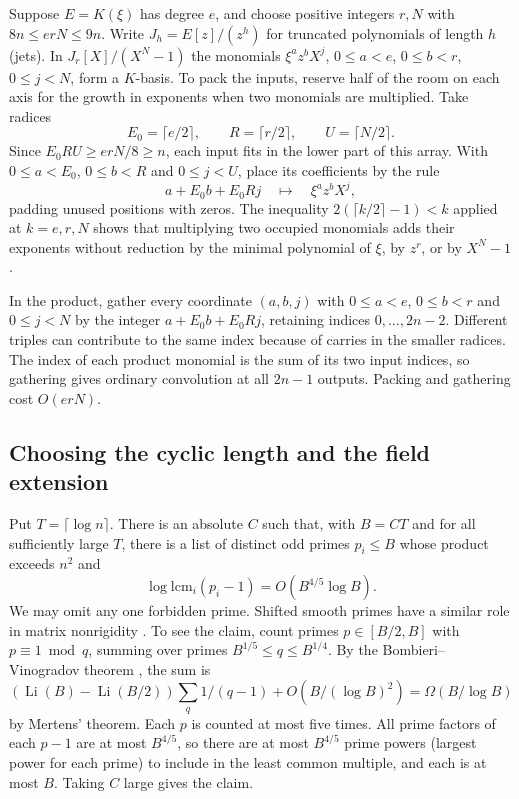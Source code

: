 Suppose $E=K(\xi)$ has degree $e$, and choose positive integers $r,N$
with $8n\le erN\le9n$. Write $J_h=E[z]/(z^h)$ for truncated
polynomials of length $h$ (jets). In $J_r[X]/(X^N-1)$ the monomials
$\xi^a z^b X^j$, $0\le a<e$, $0\le b<r$, $0\le j<N$, form a
$K$-basis. To pack the inputs, reserve half of the room on each axis
for the growth in exponents when two monomials are multiplied.
Take radices
\[
 E_0=\lceil e/2\rceil,\qquad R=\lceil r/2\rceil,\qquad
 U=\lceil N/2\rceil.
\]
Since $E_0 RU\ge erN/8\ge n$, each input fits in the lower part of this
array. With $0\le a<E_0$, $0\le b<R$ and $0\le j<U$, place its coefficients
by the rule
\begin{equation}\label{poly:eq:mixed-radix-packing}
           a+E_0 b+E_0 Rj \quad\longmapsto\quad \xi^a z^b X^j,
\end{equation}
padding unused positions with zeros. The inequality
$2(\lceil k/2\rceil-1)<k$ applied at $k=e,r,N$ shows that
multiplying two occupied monomials adds their exponents without
reduction by the minimal polynomial of $\xi$, by $z^r$, or by $X^N-1$.

In the product, gather every coordinate $(a,b,j)$ with
$0\le a<e$, $0\le b<r$ and $0\le j<N$ by the integer $a+E_0 b+E_0 Rj$, retaining
indices $0,\ldots,2n-2$. Different triples can contribute to the same
index because of carries in the smaller radices. The index of each
product monomial is the sum of its two input indices, so gathering
gives ordinary convolution at all $2n-1$ outputs. Packing and
gathering cost $O(erN)$.

\subsection{Choosing the cyclic length and the field extension}

Put $T=\lceil\log n\rceil$. There is an absolute $C$ such that, with
$B=CT$ and for all sufficiently large $T$, there is a list of distinct odd primes
$p_i\le B$ whose product exceeds $n^2$ and
\[
 \log\mathrm{lcm}_i(p_i-1)=O(B^{4/5}\log B).
\]
We may omit any one forbidden prime. Shifted smooth primes have a similar role in matrix nonrigidity
\cite[Section~4]{DvirLiu}.
To see the claim, count primes $p\in[B/2,B]$
with $p\equiv1\bmod q$, summing over primes $B^{1/5}\le q\le B^{1/4}$.
By the Bombieri--Vinogradov theorem
\cite{BombieriV}, the sum is
\[
  (\operatorname{Li}(B)-\operatorname{Li}(B/2))
              \sum_q 1/(q-1)+O(B/(\log B)^2)
   = \Omega(B/\log B)
\]
by Mertens' theorem. Each $p$ is counted at most five times.
All prime factors of each $p-1$ are at most $B^{4/5}$, so
there are at most $B^{4/5}$ prime powers (largest power for each prime)
to include in the least common multiple, and each is at most $B$.
Taking $C$ large gives the claim.

